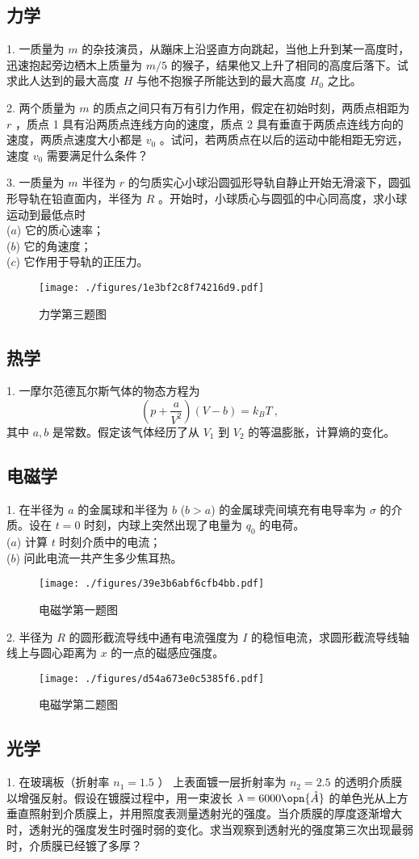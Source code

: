 \subsection{力学}
1. 一质量为 $m$ 的杂技演员，从蹦床上沿竖直方向跳起，当他上升到某一高度时，迅速抱起旁边栖木上质量为 $m/5$ 的猴子，结果他又上升了相同的高度后落下。试求此人达到的最大高度 $H$ 与他不抱猴子所能达到的最大高度 $H_{0}$ 之比。

2. 两个质量为 $m$ 的质点之间只有万有引力作用，假定在初始时刻，两质点相距为 $r$ ，质点 1 具有沿两质点连线方向的速度，质点 2 具有垂直于两质点连线方向的速度，两质点速度大小都是 $v_{0}$ 。试问，若两质点在以后的运动中能相距无穷远，速度 $v_0$ 需要满足什么条件？

3. 一质量为 $m$ 半径为 $r$ 的匀质实心小球沿圆弧形导轨自静止开始无滑滚下，圆弧形导轨在铅直面内，半径为 $R$ 。开始时，小球质心与圆弧的中心同高度，求小球运动到最低点时\\ 
($a$) 它的质心速率；\\
($b$) 它的角速度；\\
($c$) 它作用于导轨的正压力。
\begin{figure}[ht]
\centering
\texttt{[image: ./figures/1e3bf2c8f74216d9.pdf]}
\caption{力学第三题图} \label{fig_NJU17_1}
\end{figure}
\subsection{热学}
1. 一摩尔范德瓦尔斯气体的物态方程为 
\begin{equation}
\left(p+\frac{a}{V^{2}}\right)(V-b)=k_{B} T~,
\end{equation}
其中 $a, b$ 是常数。假定该气体经历了从 $V_{1}$ 到 $V_{2}$ 的等温膨胀，计算熵的变化。
\subsection{电磁学}
1. 在半径为 $a$ 的金属球和半径为 $b$ ($b>a$) 的金属球壳间填充有电导率为 $\sigma$ 的介质。设在 $t=0$ 时刻，内球上突然出现了电量为 $q_0$ 的电荷。\\
($a$) 计算 $t$ 时刻介质中的电流；\\
($b$) 问此电流一共产生多少焦耳热。
\begin{figure}[ht]
\centering
\texttt{[image: ./figures/39e3b6abf6cfb4bb.pdf]}
\caption{电磁学第一题图} \label{fig_NJU17_2}
\end{figure}
2. 半径为 $R$ 的圆形截流导线中通有电流强度为 $I$ 的稳恒电流，求圆形截流导线轴线上与圆心距离为 $x$ 的一点的磁感应强度。
\begin{figure}[ht]
\centering
\texttt{[image: ./figures/d54a673e0c5385f6.pdf]}
\caption{电磁学第二题图} \label{fig_NJU17_3}
\end{figure}
\subsection{光学}
1. 在玻璃板（折射率 $n_{1}=1.5$ ） 上表面镀一层折射率为 $n_{2}=2.5$ 的透明介质膜以增强反射。假设在镀膜过程中，用一束波长 $\lambda=6000 \opn{\mathring{A}}$ 的单色光从上方垂直照射到介质膜上，并用照度表测量透射光的强度。当介质膜的厚度逐渐增大时，透射光的强度发生时强时弱的变化。求当观察到透射光的强度第三次出现最弱时，介质膜已经镀了多厚？